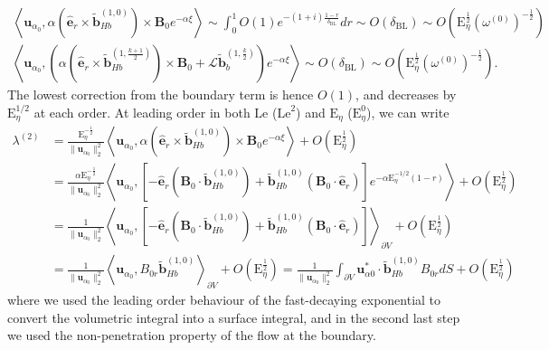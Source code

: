 \begin{equation}
\begin{gathered}
    \left\langle \mathbf{u}_{\alpha_0}, \alpha(\hat{\mathbf{e}}_r \times \widetilde{\mathbf{b}}_{Hb}^{(1,0)}) \times \mathbf{B}_0 e^{-\alpha \xi} \right\rangle \sim \int_0^1 O(1) e^{-(1+i) \frac{1-r}{\delta_{\mathrm{BL}}}} dr \sim O(\delta_{\mathrm{BL}}) \sim O\left(\mathrm{E}_\eta^{\frac{1}{2}}\left(\omega^{(0)}\right)^{-\frac{1}{2}}\right) \\
    \left\langle \mathbf{u}_{\alpha_0}, \left(\alpha(\hat{\mathbf{e}}_r \times \widetilde{\mathbf{b}}_{Hb}^{(1,\frac{k+1}{2})}) \times \mathbf{B}_0 + \mathcal{L}\widetilde{\mathbf{b}}_b^{(1,\frac{k}{2})}\right) e^{-\alpha \xi} \right\rangle \sim O(\delta_{\mathrm{BL}}) \sim O\left(\mathrm{E}_\eta^{\frac{1}{2}}\left(\omega^{(0)}\right)^{-\frac{1}{2}}\right).
\end{gathered}
\end{equation}
%
The lowest correction from the boundary term is hence $O(1)$, and decreases by $\mathrm{E}_\eta^{1/2}$ at each order.
At leading order in both $\mathrm{Le}$ ($\mathrm{Le}^2$) and $\mathrm{E}_\eta$ ($\mathrm{E}_\eta^0$), we can write 
%
\begin{equation}
\begin{aligned}
    \lambda^{(2)} &= \frac{\mathrm{E}_\eta^{-\frac{1}{2}}}{\|\mathbf{u}_{\alpha_0}\|_2^2} \left\langle \mathbf{u}_{\alpha_0}, \alpha(\hat{\mathbf{e}}_r \times \widetilde{\mathbf{b}}_{Hb}^{(1,0)}) \times \mathbf{B}_0 e^{-\alpha \xi} \right\rangle + O\left(\mathrm{E}_\eta^{\frac{1}{2}}\right) \\
    &= \frac{\alpha \mathrm{E}_\eta^{-\frac{1}{2}}}{\|\mathbf{u}_{\alpha_0}\|_2^2} \left\langle \mathbf{u}_{\alpha_0}, \left[- \hat{\mathbf{e}}_r (\mathbf{B}_0 \cdot \widetilde{\mathbf{b}}_{Hb}^{(1,0)}) + \widetilde{\mathbf{b}}_{Hb}^{(1,0)} \left(\mathbf{B}_0 \cdot \hat{\mathbf{e}}_r\right)\right] e^{-\alpha \mathrm{E}_\eta^{-1/2} (1 - r)} \right\rangle + O\left(\mathrm{E}_\eta^{\frac{1}{2}}\right) \\ 
    &= \frac{1}{\|\mathbf{u}_{\alpha_0}\|_2^2} \left\langle \mathbf{u}_{\alpha_0}, \left[- \hat{\mathbf{e}}_r (\mathbf{B}_0 \cdot \widetilde{\mathbf{b}}_{Hb}^{(1,0)}) + \widetilde{\mathbf{b}}_{Hb}^{(1,0)} \left(\mathbf{B}_0 \cdot \hat{\mathbf{e}}_r\right)\right] \right\rangle _{\partial V} + O\left(\mathrm{E}_\eta^{\frac{1}{2}}\right) \\ 
    &= \frac{1}{\|\mathbf{u}_{\alpha_0}\|_2^2} \left\langle \mathbf{u}_{\alpha_0}, B_{0r} \widetilde{\mathbf{b}}_{Hb}^{(1,0)} \right\rangle _{\partial V} + O\left(\mathrm{E}_\eta^{\frac{1}{2}}\right) = \frac{1}{\|\mathbf{u}_{\alpha_0}\|_2^2} \int_{\partial V} \mathbf{u}_{\alpha 0}^* \cdot \widetilde{\mathbf{b}}_{Hb}^{(1,0)} B_{0r} dS + O\left(\mathrm{E}_\eta^{\frac{1}{2}}\right)
\end{aligned}
\end{equation}
%
where we used the leading order behaviour of the fast-decaying exponential to convert the volumetric integral into a surface integral, and in the second last step we used the non-penetration property of the flow at the boundary.


